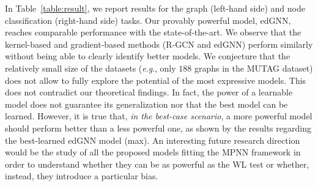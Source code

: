 \documentclass{article} \usepackage{iclr2019_conference,times}
\newcommand{\eg}{\textit{e}.\textit{g}., }
\begin{document}
In Table~\ref{table:result}, we report results for the graph (left-hand side) and node classification (right-hand side) tasks. Our provably powerful model, edGNN, reaches comparable performance with the state-of-the-art. We observe that the kernel-based and gradient-based methods (R-GCN and edGNN) perform similarly without being able to clearly identify better models. We conjecture that the relatively small size of the datasets (\eg only $188$ graphs in the MUTAG dataset) does not allow to fully explore the potential of the most expressive models.
This does not contradict our theoretical findings. In fact, the power of a learnable model does not guarantee its generalization nor that the best model can be learned. However, it is true that, \emph{in the best-case scenario}, a more powerful model should perform better than a less powerful one, as shown by the results regarding the best-learned edGNN model (max).
An interesting future research direction would be the study of all the proposed models fitting the MPNN framework in order to understand whether they can be as powerful as the WL test or whether, instead, they introduce a particular bias. 
\end{document}
